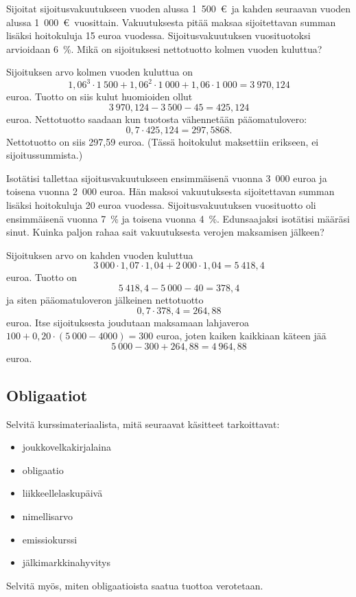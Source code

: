 \documentclass{article}\usepackage[]{graphicx}\usepackage[]{color}
\begin{document}
\begin{question} Sijoitat sijoitusvakuutukseen vuoden alussa 1~500~\euro\ ja kahden seuraavan vuoden alussa 1~000~\euro\ vuosittain. Vakuutuksesta pitää maksaa sijoitettavan summan lisäksi hoitokuluja 15 euroa vuodessa. Sijoitusvakuutuksen vuosituotoksi arvioidaan 6~\%. Mikä on sijoituksesi nettotuotto kolmen vuoden kuluttua? 
\end{question}
\begin{solution}


Sijoituksen arvo kolmen vuoden kuluttua on 
\[
  1{,}06^3\cdot1~500 + 1{,}06^2\cdot1~000 + 1{,}06\cdot1~000 = 3~970{,}124
\]
euroa.
Tuotto on siis kulut huomioiden ollut 
\[
  3~970{,}124 - 3~500 - 45 = 425{,}124
  \]
  euroa. Nettotuotto saadaan kun tuotosta vähennetään pääomatulovero:
\[
  0,7\cdot425{,}124 = 297{,}5868.
\]
Nettotuotto on siis 297{,}59 euroa. (Tässä hoitokulut maksettiin erikseen, ei sijoitussummista.)
\end{solution}

\begin{question} Isotätisi tallettaa sijoitusvakuutukseen ensimmäisenä vuonna 3~000 euroa ja toisena vuonna 2~000 euroa. Hän maksoi vakuutuksesta sijoitettavan summan lisäksi hoitokuluja 20 euroa vuodessa. Sijoitusvakuutuksen vuosituotto oli ensimmäisenä vuonna 7~\% ja toisena vuonna 4~\%. Edunsaajaksi isotätisi määräsi sinut. Kuinka paljon rahaa sait vakuutuksesta verojen maksamisen jälkeen?
\end{question}
\begin{solution}

Sijoituksen arvo on kahden vuoden kuluttua
\[
  3~000\cdot1{,}07\cdot1{,}04 + 2~000\cdot1{,}04 = 5~418{,}4
\]
euroa. Tuotto on 
\[
  5~418{,}4 - 5~000 - 40 = 378{,}4
\]
ja siten pääomatuloveron jälkeinen nettotuotto
\[
  0,7\cdot 378{,}4 = 264{,}88
\]
euroa. Itse sijoituksesta joudutaan maksamaan lahjaveroa \(100 + 0,20\cdot(5~000 - 4000) = 300\) euroa, joten kaiken kaikkiaan käteen jää
\[
5~000 - 300 + 264{,}88 = 4~964{,}88
\]
euroa. 
\end{solution}

\subsection*{Obligaatiot}

\begin{question}
  Selvitä kurssimateriaalista, mitä seuraavat käsitteet tarkoittavat:
  \begin{itemize}
    \item joukkovelkakirjalaina
    \item obligaatio
    \item liikkeellelaskupäivä
    \item nimellisarvo
    \item emissiokurssi
    \item jälkimarkkinahyvitys
  \end{itemize}
  Selvitä myös, miten obligaatioista saatua tuottoa verotetaan.
\end{question}
\end{document}
